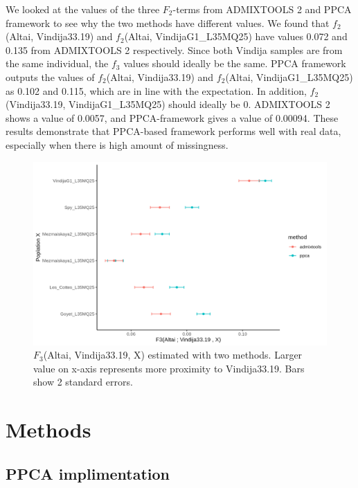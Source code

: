 \documentclass[12pt, letterpaper]{article}
\begin{document}
We looked at the values of the three $F_2$-terms from ADMIXTOOLS 2 and PPCA framework to see why the two methods have different values. We found that $f_2$(Altai, Vindija33.19) and $f_2$(Altai, VindijaG1\_L35MQ25) have values 0.072 and 0.135 from ADMIXTOOLS 2 respectively. Since both Vindija samples are from the same individual, the $f_3$ values should ideally be the same. PPCA framework outputs the values of $f_2$(Altai, Vindija33.19) and $f_2$(Altai, VindijaG1\_L35MQ25) as 0.102 and 0.115, which are in line with the expectation. In addition, $f_2$(Vindija33.19, VindijaG1\_L35MQ25) should ideally be 0. ADMIXTOOLS 2 shows a value of 0.0057, and PPCA-framework gives a value of 0.00094. These results demonstrate that PPCA-based framework performs well with real data, especially when there is high amount of missingness. 

\begin{figure}[ht!]
    \includegraphics[width=16.5cm]{plots/f3_neandertal.png}
    \centering
    \caption{$F_3$(Altai, Vindija33.19, X) estimated with two methods. Larger value on x-axis represents more proximity to Vindija33.19. Bars show 2 standard errors.}
    \label{figS1:pc_scale}
\end{figure}

\section{Methods}

\subsection{PPCA implimentation}
\end{document}

